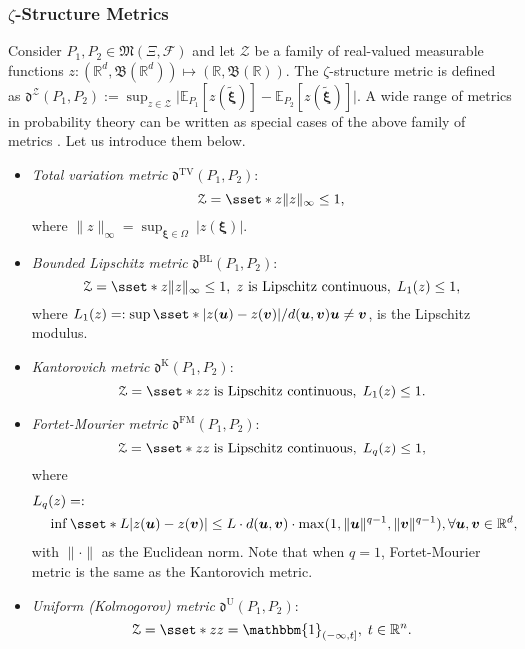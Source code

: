 \documentclass[final,onefignum,onetabnum]{class}
\newcommand{\ee}[2]{\mathbb{E}_{#1} \left[ #2 \right]}
\newcommand{\bs}[1]{\boldsymbol{#1}} %
\newcommand{\Bs}[1]{\mathbb{#1}} %
\newcommand{\Cs}[1]{\mathcal{#1}} %
\newcommand{\Fs}[1]{\mathfrak{#1}} %
\newcommand{\txi}{\tilde{\bs{\xi}}}
\newcommand{\measurespace}{\left( \Xi, \Cs{F} \right)}
\newcommand{\probspace}[1]{\left( \Bs{R}^{#1}, \Fs{B}(\Bs{R}^{#1}) \right)}
\begin{document}
\subsubsection[Zeta-Structure Metrics]{\texorpdfstring{$\zeta$-Structure Metrics}{Zeta-Structure Metrics}}

Consider  $P_{1}, P_{2} \in \Fs{M}\measurespace$ and let $\Cs{Z}$ be a family of real-valued measurable functions $z: \probspace{d} \mapsto (\Bs{R},\Fs{B}(\Bs{R}))$. The   $\zeta$-structure metric is defined as $\Fs{d}^{\Cs{Z}}(P_{1},P_{2}):=\sup_{ z \in \Cs{Z}} \Big| \ee{P_{1}}{z(\txi)} - \ee{P_{2}}{z(\txi)} \Big|$. A wide range of metrics in probability theory can be written as special cases of the above family of metrics \cite{zhao2015,pichler2017}. Let us introduce them below. 

\begin{itemize}
    \item {\it Total variation metric} $\Fs{d}^{\text{TV}}(P_{1},P_{2})$: $$\Cs{Z}=\sset*{z}{\|z\|_{\infty} \le 1}, $$ where $\|z\|_{\infty}= \sup_{\bs{\xi}  \in \Omega } \ |z(\bs{\xi})|$.

    \item {\it Bounded Lipschitz metric} $\Fs{d}^{\text{BL}}(P_{1},P_{2})$:	   $$\Cs{Z}=\sset*{z}{\|z\|_{\infty} \le 1, \; z \ \text{is Lipschitz continuous}, \; L_{1}(z) \le 1 },$$ where $L_{1}(z)=: \sup \sset*{|z(\bs{u})-z(\bs{v})|/d(\bs{u},\bs{v})}{ \bs{u} \neq \bs{v} }$, is the Lipschitz modulus. 

    \item {\it Kantorovich metric} $\Fs{d}^{\text{K}}(P_{1},P_{2})$: $$\Cs{Z}=\sset*{z}{z \; \text{is Lipschitz continuous}, \; L_{1}(z) \le 1 }.$$ 


    \item {\it Fortet-Mourier metric} $\Fs{d}^{\text{FM}}(P_{1},P_{2})$: $$\Cs{Z}=\sset*{z}{z \; \text{is Lipschitz continuous}, \; L_{q}(z) \le 1},$$ where   
    \begin{equation*}
        \begin{split}
                L_{q}& (z)=: \\
                & \inf \sset*{L}{ |z(\bs{u})-z(\bs{v})| \le L \cdot d(\bs{u},\bs{v}) \cdot \max(1, \|\bs{u}\|^{q-1}, \|\bs{v}\|^{q-1}), \forall \bs{u},\bs{v} \in \Bs{R}^{d} },
        \end{split}
    \end{equation*}
    with $\|\cdot\|$ as the Euclidean norm. Note that when $q=1$, Fortet-Mourier metric is the same as the Kantorovich metric. 
  
  
    \item {\it Uniform (Kolmogorov) metric} $\Fs{d}^{\text{U}}(P_{1},P_{2})$:  $$\Cs{Z}=\sset*{z}{z=\mathbbm{1}_{(-\infty, t]}, \; t \in \Bs{R}^{n} }.$$

\end{itemize}
\end{document}
